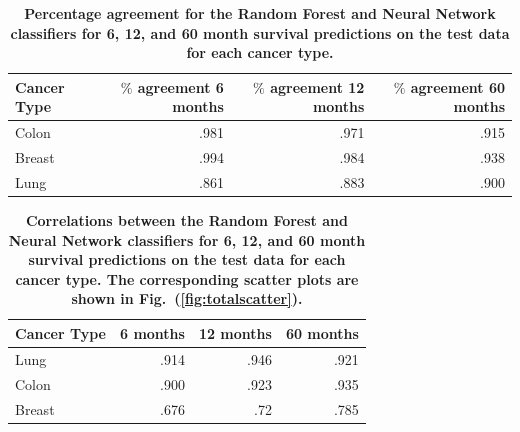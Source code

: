 \documentclass[10pt,letterpaper]{article}
\begin{document}
\begin{table}[!ht]
\begin{adjustwidth}{-2.25in}{0in} %
\caption{\label{tab:agree} {\bf Percentage agreement for the Random Forest and Neural Network classifiers for 6, 12, and 60 month survival predictions on the test data for each cancer type.}}
\begin{tabular}{lrrr}
\toprule
Cancer Type & $\%$ agreement 6 months & $\%$ agreement 12 months & $\%$ agreement 60 months \\ 
\midrule
Colon & .981 & .971 & .915 \\  
Breast & .994 & .984 & .938 \\  
Lung & .861 & .883 & .900 \\  
\bottomrule
\end{tabular}
\end{adjustwidth}
\end{table}



\begin{table}[!ht]
\begin{adjustwidth}{-2.25in}{0in} %
\caption{\label{tab:corr} {\bf Correlations between the Random Forest and Neural Network classifiers for 6, 12, and 60 month survival predictions on the test data for each cancer type. The corresponding scatter plots are shown in Fig.~(\ref{fig:totalscatter}).}}
\begin{tabular}{lrrr}
\toprule
Cancer Type &  6 months &  12 months &   60 months \\ 
\midrule
Lung & .914 & .946 & .921 \\  
Colon & .900 & .923 & .935 \\  
Breast & .676 & .72 & .785 \\  
\bottomrule
\end{tabular}
\end{adjustwidth}
\end{table}
\end{document}
